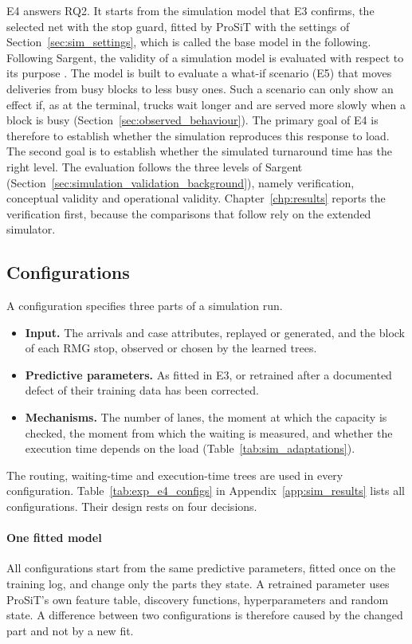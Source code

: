 E4 answers RQ2. It starts from the simulation model that E3 confirms, the selected
net with the stop guard, fitted by ProSiT with the settings of
Section~\ref{sec:sim_settings}, which is called the base model in the following.
Following Sargent, the validity of a simulation model is evaluated with respect to its
purpose \cite{Sargent2013Validation}. The model is built to evaluate a what-if
scenario (E5) that moves deliveries from busy blocks to less busy ones. Such a
scenario can only show an effect if, as at the terminal, trucks wait longer and are
served more slowly when a block is busy (Section~\ref{sec:observed_behaviour}). The
primary goal of E4 is therefore to establish whether the simulation reproduces this
response to load. The second goal is to establish whether the simulated turnaround
time has the right level. The evaluation follows the three levels of Sargent
(Section~\ref{sec:simulation_validation_background}), namely verification,
conceptual validity and operational validity. Chapter~\ref{chp:results} reports the
verification first, because the comparisons that follow rely on the extended
simulator.

\subsection{Configurations}
\label{sec:exp_e4_configs}

A configuration specifies three parts of a simulation run.
\begin{itemize}
\item \textbf{Input.} The arrivals and case attributes, replayed or generated, and
the block of each RMG stop, observed or chosen by the learned trees.
\item \textbf{Predictive parameters.} As fitted in E3, or retrained after a
documented defect of their training data has been corrected.
\item \textbf{Mechanisms.} The number of lanes, the moment at which the capacity is
checked, the moment from which the waiting is measured, and whether the execution
time depends on the load (Table~\ref{tab:sim_adaptations}).
\end{itemize}
The routing, waiting-time and execution-time trees are used in every configuration.
Table~\ref{tab:exp_e4_configs} in Appendix~\ref{app:sim_results} lists all
configurations. Their design rests on four decisions.

\paragraph{One fitted model} All configurations start from the same predictive
parameters, fitted once on the training log, and change only the parts they state.
A retrained parameter uses ProSiT's own feature table, discovery functions,
hyperparameters and random state. A difference between two configurations is
therefore caused by the changed part and not by a new fit.

